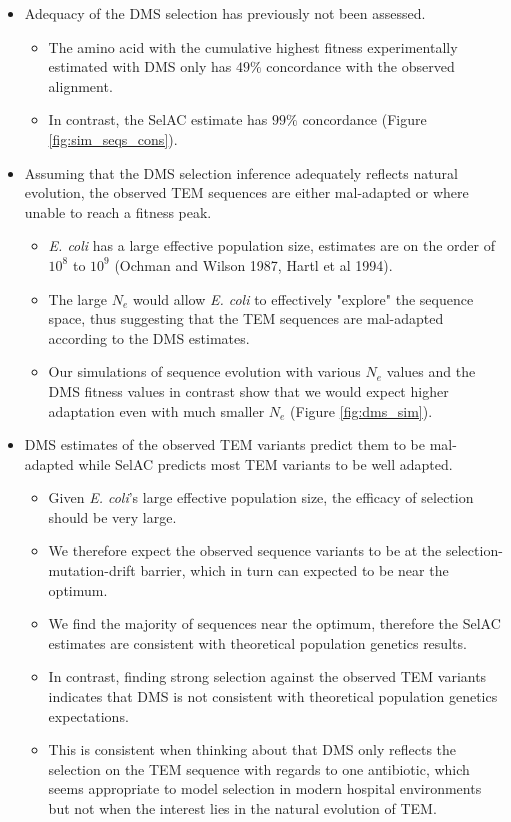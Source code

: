 \documentclass[12pt]{article}
\begin{document}
\begin{itemize}
	\item Adequacy of the DMS selection has previously not been assessed.
	\begin{itemize}	
		\item The amino acid with the cumulative highest fitness experimentally estimated with DMS only has $49 \%$ concordance with the observed alignment.
		\item In contrast, the SelAC estimate has $99 \%$ concordance (Figure \ref{fig:sim_seqs_cons}). 
	\end{itemize}

	\item Assuming that the DMS selection inference adequately reflects natural evolution, the observed TEM sequences are either mal-adapted or where unable to reach a fitness peak.
	\begin{itemize}
		\item \textit{E. coli} has a large effective population size, estimates are on the order of $10^8$ to $10^9$ (Ochman and Wilson 1987, Hartl et al 1994).
		\item The large $N_e$ would allow \textit{E. coli} to effectively "explore" the sequence space, thus suggesting that the TEM sequences are mal-adapted according to the DMS estimates.
		\item Our simulations of sequence evolution with various $N_e$ values and the DMS fitness values in contrast show that we would expect higher adaptation even with much smaller $N_e$ (Figure \ref{fig:dms_sim}).
	\end{itemize}

	\item DMS estimates of the observed TEM variants predict them to be mal-adapted while SelAC predicts most TEM variants to be well adapted.
	\begin{itemize}
		\item Given \textit{E. coli}'s large effective population size, the efficacy of selection should be very large.
		\item We therefore expect the observed sequence variants to be at the selection-mutation-drift barrier, which in turn can expected to be near the optimum.
		\item We find the majority of sequences near the optimum, therefore the SelAC estimates are consistent with theoretical population genetics results.
		\item In contrast, finding strong selection against the observed TEM variants indicates that DMS is not consistent with theoretical population genetics expectations.
		\item This is consistent when thinking about that DMS only reflects the selection on the TEM sequence with regards to one antibiotic, which seems appropriate to model selection in modern hospital environments but not when the interest lies in the natural evolution of TEM.
	\end{itemize}


\end{itemize}
\end{document}

